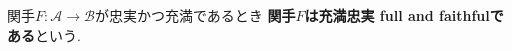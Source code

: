 \begin{Def}
関手$F:\mathscr{A}\rightarrow\mathscr{B}$が忠実かつ充満であるとき
{\bf 関手$F$は充満忠実 full and faithfulである}という.
\end{Def}
\begin{comment}
\begin{Def}
圏$\mathscr{A}$が圏$\mathscr{A}$の部分圏であり, 関手$F:\mathscr{A}\rightarrow\mathscr{B}$が充満であるとき,
{\bf 圏$\mathscr{A}$は圏 $\mathscr{B}$の充満部分圏である}という.
\end{Def}
\end{comment}
\begin{comment}
\begin{example}
...充満忠実である.
\end{example}
\begin{example}
...忠実だが充満でない
\end{example}
\begin{example}
充満だが忠実でない
\end{example}
\begin{example}
複素数...

...

...忠実だが充満でない. （例1.30)
\end{example}
\end{comment}
\begin{comment}
\subsection{埋め込み関手}
\subsection{忘却関手}
\end{comment}
